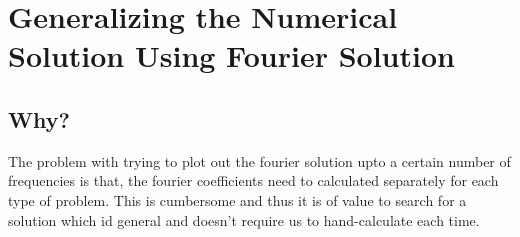 
\chapter{Generalizing the Numerical Solution Using Fourier Solution}

\label{Chapter8} %


\section{Why?}
The problem with trying to plot out the fourier solution upto a certain number of frequencies is that, the fourier coefficients need to calculated separately for each type of problem. This is cumbersome and thus it is of value to search for a solution which id general and doesn't require us to hand-calculate each time.
